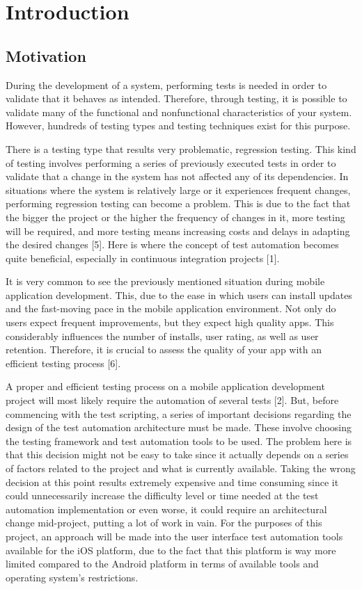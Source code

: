 %
\chapter{Introduction}
\label{sec:intro}

\section{Motivation}

During the development of a system, performing tests is needed in order to validate that it behaves as intended. Therefore, through testing, it is possible to validate many of the functional and nonfunctional characteristics of your system. However, hundreds of testing types and testing techniques exist for this purpose.

There is a testing type that results very problematic, regression testing. This kind of testing involves performing a series of previously executed tests in order to validate that a change in the system has not affected any of its dependencies. In situations where the system is relatively large or it experiences frequent changes, performing regression testing can become a problem. This is due to the fact that the bigger the project or the higher the frequency of changes in it, more testing will be required, and more testing means increasing costs and delays in adapting the desired changes [5]. Here is where the concept of test automation becomes quite beneficial, especially in continuous integration projects [1].

It is very common to see the previously mentioned situation during mobile application development. This, due to the ease in which users can install updates and the fast-moving pace in the mobile application environment. Not only do users expect frequent improvements, but they expect high quality apps. This considerably influences the number of installs, user rating, as well as user retention. Therefore, it is crucial to assess the quality of your app with an efficient testing process [6].

A proper and efficient testing process on a mobile application development project will most likely require the automation of several tests [2]. But, before commencing with the test scripting, a series of important decisions regarding the design of the test automation architecture must be made. These involve choosing the testing framework and test automation tools to be used. The problem here is that this decision might not be easy to take since it actually depends on a series of factors related to the project and what is currently available. Taking the wrong decision at this point results extremely expensive and time consuming since it could unnecessarily increase the difficulty level or time needed at the test automation implementation or even worse, it could require an architectural change mid-project, putting a lot of work in vain. For the purposes of this project, an approach will be made into the user interface test automation tools available for the iOS platform, due to the fact that this platform is way more limited compared to the Android platform in terms of available tools and operating system’s restrictions.

